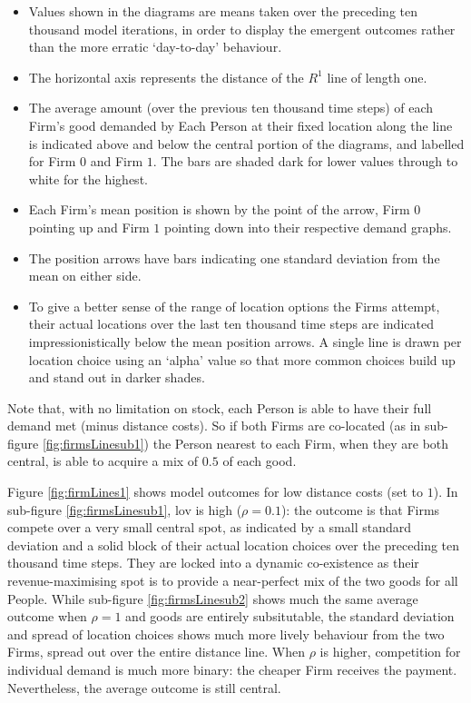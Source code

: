 \begin{itemize}
	\item Values shown in the diagrams are means taken over the preceding ten thousand model iterations, in order to display the emergent outcomes rather than the more erratic `day-to-day' behaviour.
	\item The horizontal axis represents the distance of the $R^1$ line of length one. 
	\item The average amount (over the previous ten thousand time steps) of each Firm's good demanded by Each Person at their fixed location along the line is indicated above and below the central portion of the diagrams, and labelled for Firm $0$ and Firm $1$. The bars are shaded dark for lower values through to white for the highest. 
	\item Each Firm's mean position is shown by the point of the arrow, Firm $0$ pointing up and Firm $1$ pointing down into their respective demand graphs.
	\item The position arrows have bars indicating one standard deviation from the mean on either side.
	\item To give a better sense of the range of location options the Firms attempt, their actual locations over the last ten thousand time steps are indicated impressionistically below the mean position arrows. A single line is drawn per location choice using an `alpha' value so that more common choices build up and stand out in darker shades.
\end{itemize}

Note that, with no limitation on stock, each Person is able to have their full demand met (minus distance costs). So if both Firms are co-located (as in sub-figure \ref{fig:firmsLinesub1}) the Person nearest to each Firm, when they are both central, is able to acquire a mix of $0.5$ of each good. 

Figure \ref{fig:firmLines1} shows model outcomes for low distance costs (set to $1$). In sub-figure \ref{fig:firmsLinesub1}, \gls{lov} is high ($\rho=0.1$): the outcome is that Firms compete over a very small central spot, as indicated by a small standard deviation and a solid block of their actual location choices over the preceding ten thousand time steps. They are locked into a dynamic co-existence as their revenue-maximising spot is to provide a near-perfect mix of the two goods for all People. While sub-figure \ref{fig:firmsLinesub2} shows much the same average outcome when $\rho=1$ and goods are entirely subsitutable, the standard deviation and spread of location choices shows much more lively behaviour from the two Firms, spread out over the entire distance line. When $\rho$ is higher, competition for individual demand is much more binary: the cheaper Firm receives the payment. Nevertheless, the average outcome is still central.

